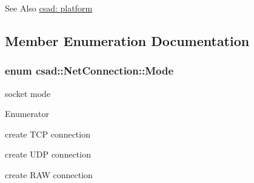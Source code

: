 \begin{DoxySeeAlso}{See Also}
\hyperlink{group__platform}{csad\-: platform} 
\end{DoxySeeAlso}


\subsection{Member Enumeration Documentation}
\hypertarget{classcsad_1_1_net_connection_a3b8242f34d97fe051d6eab451b6db3b5}{
\subsubsection[{Mode}]{\setlength{\rightskip}{0pt plus 5cm}enum {\bf csad\-::\-Net\-Connection\-::\-Mode}}}\label{classcsad_1_1_net_connection_a3b8242f34d97fe051d6eab451b6db3b5}


socket mode 

\begin{Desc}
\item[Enumerator]\par
\begin{description}
\item[{\em 
\hypertarget{classcsad_1_1_net_connection_a3b8242f34d97fe051d6eab451b6db3b5a47d79c745230e16a4402daabece4788b}{N\-C\-\_\-\-T\-C\-P}\label{classcsad_1_1_net_connection_a3b8242f34d97fe051d6eab451b6db3b5a47d79c745230e16a4402daabece4788b}
}]create T\-C\-P connection \item[{\em 
\hypertarget{classcsad_1_1_net_connection_a3b8242f34d97fe051d6eab451b6db3b5a9bc0746a60d6a49de4c09e67586ad7d9}{N\-C\-\_\-\-U\-D\-P}\label{classcsad_1_1_net_connection_a3b8242f34d97fe051d6eab451b6db3b5a9bc0746a60d6a49de4c09e67586ad7d9}
}]create U\-D\-P connection \item[{\em 
\hypertarget{classcsad_1_1_net_connection_a3b8242f34d97fe051d6eab451b6db3b5a67c9b49521cbc221e928764cf96dbf4d}{N\-C\-\_\-\-R\-A\-W}\label{classcsad_1_1_net_connection_a3b8242f34d97fe051d6eab451b6db3b5a67c9b49521cbc221e928764cf96dbf4d}
}]create R\-A\-W connection \end{description}
\end{Desc}
